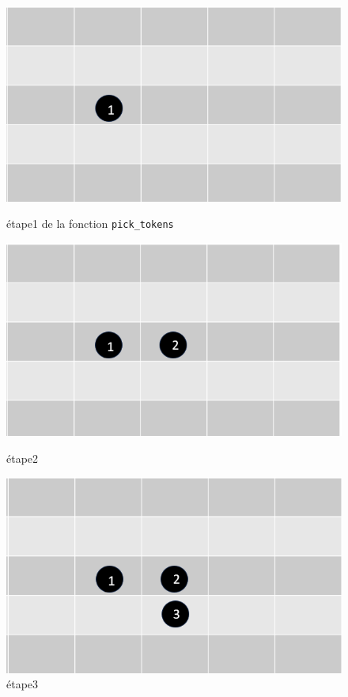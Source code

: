 \documentclass{article}
\begin{document}
\begin{figure}[ht]
  \begin{minipage}[b]{0.5\linewidth}
    \centering
    \includegraphics[width=0.9\linewidth]{etape1.PNG}
    \caption{étape1 de la fonction \texttt{pick\_tokens}}
    \label{fig:etape1}
  \end{minipage}
  \hfill
  \vspace{1em}
  \begin{minipage}[b]{0.50\linewidth}
    \centering
    \includegraphics[width=0.9\linewidth]{etape2.PNG}
    \caption{étape2}
    \label{fig:etape2}
  \end{minipage}
  \hfill
  \begin{minipage}[b]{0.50\linewidth}
    \centering
    \includegraphics[width=0.9\linewidth]{etape3.PNG}
    \caption{étape3}
    \label{fig:etape3}
  \end{minipage}
\end{figure}
\end{document}
